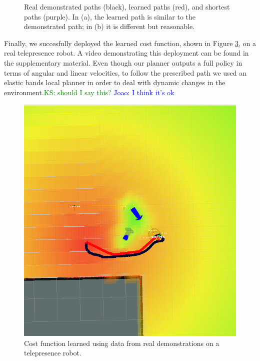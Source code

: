 \documentclass[letterpaper, 10 pt, conference]{ieeeconf}
\newcommand{\jm}[1]{\textcolor{blue}{Joao: #1}}
\newcommand{\ks}[1]{\textcolor{green}{KS: #1}}
\begin{document}
\begin{figure}[tbh]
\begin{subfigure}[b]{0.42\columnwidth}
    \caption{}
    \label{fig:res_real4}
  \end{subfigure} 
    \caption{Real demonstrated paths (black), learned paths (red), and shortest paths (purple). In (a), the learned path is similar to the demonstrated path; in (b) it is different but reasonable.}
    \vspace{-2mm}
  \label{fig:results_real}
  \end{figure}

	Finally, we succesfully deployed the learned cost function, shown in Figure \ref{fig:real_cf}, on a real telepresence robot. A video demonstrating this deployment can be found in the supplementary material. Even though our planner outputs a full policy in terms of angular and linear velocities, to follow the prescribed path we used an elastic bands local planner in order to deal with dynamic changes in the environment.\ks{should I say this?} \jm{I think it's ok} 

	\begin{figure}[tbh]
	\centering
    \includegraphics[scale=0.15]{images/cf_real.png}
    \caption{Cost function learned using data from real demonstrations on a telepresence robot.}
    \vspace{-2mm}
  \label{fig:real_cf}
  \end{figure}
\end{document}
